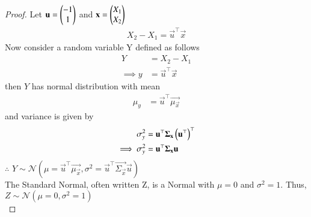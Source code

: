 \documentclass[journal,12pt,twocolumn]{IEEEtran}
\begin{document}
\begin{proof}
    Let $\mathbf{u}=\begin{pmatrix}-1\\
                        1\end{pmatrix}$ and $\mathbf{x}=\begin{pmatrix}X_1\\
                                            X_2\end{pmatrix}$ 
    \begin{align}
        X_2-X_1=\vec{u}^{\top}\vec{x}
    \end{align}
    Now consider a random variable Y defined as follows
    \begin{align}
        Y&=X_2-X_1\\
        \implies y&=\vec{u}^{\top}\vec{x}
    \end{align}
    then $Y$ has normal distribution with mean
    \begin{align}
        \mu_{y}&=\vec{u}^{\top}\vec{\mu_{\vec{x}}}
    \end{align}
    and variance is given by
    \begin{align}
        \sigma^2_{y}&=\mathbf{u}^{\top}\mathbf{\Sigma_{\mathbf{x}}}\left(\mathbf{u}^{\top}\right)^{\top}\\
        \implies \sigma^2_{y}&=\mathbf{u}^{\top}\mathbf{\Sigma_{\mathbf{x}}}\mathbf{u}
    \end{align}
    $\therefore$ $Y\sim\mathcal{N}(\mu=\vec{u}^{\top}\vec{\mu_{\vec{x}}},\sigma^2=\vec{u}^{\top}\vec{\Sigma_{\vec{x}}}\vec{u})$\\
    
    The Standard Normal, often written Z, is a Normal with $\mu=0$ and $\sigma^2=1$. Thus, $Z \sim \mathcal{N}(\mu=0,\sigma^2=1)$\\


\end{proof}
\end{document}
